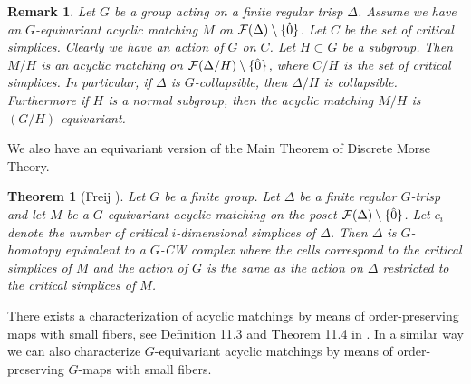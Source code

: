 \documentclass{elsarticle}
\newtheorem{thm}[df]{Theorem}
\newtheorem{rem}[df]{Remark}
\begin{document}
\begin{rem}
\label{quotmatching}
Let $G$ be a group acting on a finite regular trisp $\Delta$. Assume we have an $G$-equivariant acyclic matching $M$ on ${\cal F}(\Delta)\setminus\{\hat{0}\}$. Let $C$ be the set of critical simplices. Clearly we have an action of $G$ on $C$. Let $H\subset G$ be a subgroup. Then $M/H$ is an acyclic matching on ${\cal F}(\Delta/H)\setminus\{\hat{0}\}$, where $C/H$ is the set of critical simplices. In particular, if $\Delta$ is $G$-collapsible, then $\Delta/H$ is collapsible. Furthermore if $H$ is a normal subgroup, then the acyclic matching $M/H$ is $(G/H)$-equivariant.
\end{rem}
We also have an equivariant version of the Main Theorem of Discrete Morse Theory.
\begin{thm}[Freij \cite{freij}]
\label{freij}
Let $G$ be a finite group. Let $\Delta$ be a finite regular $G$-trisp and let $M$ be a $G$-equivariant acyclic matching on the poset ${\cal F}(\Delta)\setminus\{\hat{0}\}$. Let $c_i$ denote the number of critical $i$-dimensional simplices of $\Delta$. Then $\Delta$ is $G$-homotopy equivalent to a $G$-CW complex where the cells correspond to the critical simplices of $M$ and the action of $G$ is the same as the action on $\Delta$ restricted to the critical simplices of $M$.
\end{thm}
There exists a characterization of acyclic matchings by means of order-preserving maps with small fibers, see Definition 11.3 and Theorem 11.4 in \cite[Chapter 11]{buch}. In a similar way we can also characterize $G$-equivariant acyclic matchings by means of order-preserving $G$-maps with small fibers.
\end{document}
